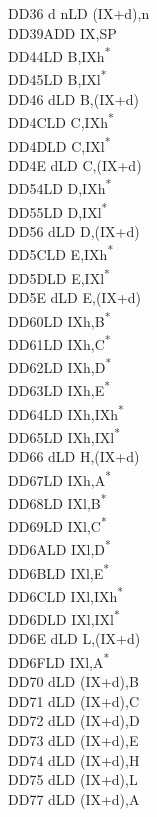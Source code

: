 \documentclass[twoside,openright,a4paper]{book}
\begin{document}
\begin{multicols}{3}
{\begin{tabbing}
	DD36 d n\>LD (IX+d),n\\
	DD39\>ADD IX,SP\\
	DD44\>LD B,IXh\textsuperscript{*}\\
	DD45\>LD B,IXl\textsuperscript{*}\\
	DD46 d\>LD B,(IX+d)\\
	DD4C\>LD C,IXh\textsuperscript{*}\\
	DD4D\>LD C,IXl\textsuperscript{*}\\
	DD4E d\>LD C,(IX+d)\\
	DD54\>LD D,IXh\textsuperscript{*}\\
	DD55\>LD D,IXl\textsuperscript{*}\\
	DD56 d\>LD D,(IX+d)\\
	DD5C\>LD E,IXh\textsuperscript{*}\\
	DD5D\>LD E,IXl\textsuperscript{*}\\
	DD5E d\>LD E,(IX+d)\\
	DD60\>LD IXh,B\textsuperscript{*}\\
	DD61\>LD IXh,C\textsuperscript{*}\\
	DD62\>LD IXh,D\textsuperscript{*}\\
	DD63\>LD IXh,E\textsuperscript{*}\\
	DD64\>LD IXh,IXh\textsuperscript{*}\\
	DD65\>LD IXh,IXl\textsuperscript{*}\\
	DD66 d\>LD H,(IX+d)\\
	DD67\>LD IXh,A\textsuperscript{*}\\
	DD68\>LD IXl,B\textsuperscript{*}\\
	DD69\>LD IXl,C\textsuperscript{*}\\
	DD6A\>LD IXl,D\textsuperscript{*}\\
	DD6B\>LD IXl,E\textsuperscript{*}\\
	DD6C\>LD IXl,IXh\textsuperscript{*}\\
	DD6D\>LD IXl,IXl\textsuperscript{*}\\
	DD6E d\>LD L,(IX+d)\\
	DD6F\>LD IXl,A\textsuperscript{*}\\
	DD70 d\>LD (IX+d),B\\
	DD71 d\>LD (IX+d),C\\
	DD72 d\>LD (IX+d),D\\
	DD73 d\>LD (IX+d),E\\
	DD74 d\>LD (IX+d),H\\
	DD75 d\>LD (IX+d),L\\
	DD77 d\>LD (IX+d),A\\

\end{tabbing}}
\end{multicols}
\end{document}
